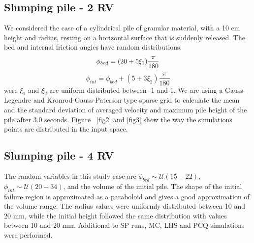 \documentclass{article}
\begin{document}
\subsection{Slumping pile - 2 RV}
We considered the case of a cylindrical pile of granular material,
with a 10 cm height and radius, resting on a horizontal surface that
is suddenly released. The bed and internal friction angles have random
distributions:
\begin{equation} 
\phi_{bed} = (20 + 5\xi_1)\frac{\pi}{180} \\
\end{equation} 
\begin{equation} \nonumber
\phi_{int} = \phi_{bed} + (5 + 3\xi_2)\frac{\pi}{180}
\end{equation} 
were $\xi_1$ and $\xi_2$ are uniform distributed between -1 and 1.
We are using a Gauss-Legendre and Kronrod-Gauss-Paterson type 
sparse grid to calculate the mean and the standard deviation of averaged velocity
and maximum pile height of the pile after 3.0 seconds. Figure ~\ref{fig2} 
and \ref{fig3} show the way the simulations points are distributed 
in the input space. 

\subsection{Slumping pile - 4 RV}
The random variables in this study case are $\phi_{bed} \sim\mathcal{U}(15-22)$,
$\phi_{int} \sim\mathcal{U}(20-34)$, and the volume of the initial pile. The shape 
of the initial failure region is approximated as a paraboloid and gives a good
approximation of the volume range. The radius values were uniformly distributed 
between 10 and 20 mm, while the initial height followed the same distribution with values 
between 10 and 20 mm. Additional to SP runs, MC, LHS and PCQ simulations were 
performed.
\end{document}

